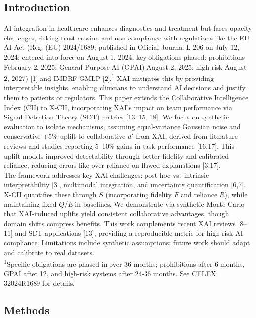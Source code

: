 \documentclass[a4paper]{article}
\begin{document}
\subsection{Introduction}\label{introduction}

AI integration in healthcare enhances diagnostics and treatment but
faces opacity challenges, risking trust erosion and non-compliance with
regulations like the EU AI Act (Reg. (EU) 2024/1689; published in
Official Journal L 206 on July 12, 2024; entered into force on August 1,
2024; key obligations phased: prohibitions February 2, 2025; General
Purpose AI (GPAI) August 2, 2025; high-risk August 2, 2027) {[}1{]} and
IMDRF GMLP {[}2{]}.\textsuperscript{1} XAI mitigates this by providing interpretable
insights, enabling clinicians to understand AI decisions and justify
them to patients or regulators. This paper extends the Collaborative
Intelligence Index (CII) to X-CII, incorporating XAI's impact on team
performance via Signal Detection Theory (SDT) metrics {[}13--15, 18{]}.
We focus on synthetic evaluation to isolate mechanisms, assuming
equal-variance Gaussian noise and conservative +5\% uplift to
collaborative $d'$ from XAI, derived from literature reviews and studies
reporting 5--10\% gains in task performance {[}16,17{]}. This uplift
models improved detectability through better fidelity and calibrated
reliance, reducing errors like over-reliance on flawed explanations
{[}3,17{]}.\\
The framework addresses key XAI challenges: post-hoc vs.~intrinsic
interpretability {[}3{]}, multimodal integration, and uncertainty
quantification {[}6,7{]}. X-CII quantifies these through $S$
(incorporating fidelity $F$ and reliance $R$), while maintaining fixed $Q$/$E$
in baselines. We demonstrate via synthetic Monte Carlo that XAI-induced
uplifts yield consistent collaborative advantages, though domain shifts
compress benefits. This work complements recent XAI reviews {[}8--11{]}
and SDT applications {[}13{]}, providing a reproducible metric for
high-risk AI compliance. Limitations include synthetic assumptions;
future work should adapt and calibrate to real datasets.\\
\textsuperscript{1}Specific obligations are phased in over 36 months; prohibitions after 6
months, GPAI after 12, and high-risk systems after 24-36 months. See
CELEX: 32024R1689 for details.

\subsection{Methods}\label{methods}
\end{document}
